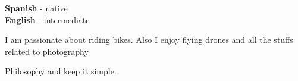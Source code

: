\documentclass[9pt]{developercv} %
\begin{document}
\begin{minipage}[t]{0.3\textwidth}
	\vspace{-\baselineskip} %

	
	\textbf{Spanish} - native\\
	\textbf{English} - intermediate\\
\end{minipage}
\hfill
\begin{minipage}[t]{0.3\textwidth}
	\vspace{-\baselineskip} %
	
	
	I am passionate about riding bikes. Also I enjoy flying drones and all the stuffs related to photography
\end{minipage}
\hfill
\begin{minipage}[t]{0.3\textwidth}
	\vspace{-\baselineskip} %
	
	
	Philosophy and keep it simple.
\end{minipage}
\hfill

\end{document}
